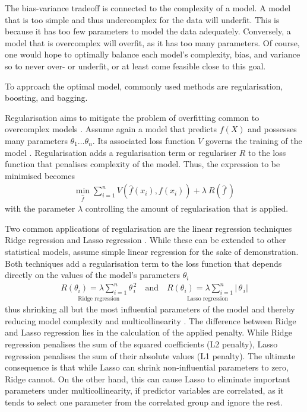 The bias-variance tradeoff is connected to the complexity of a model. A model 
that is too simple and thus undercomplex for the data will underfit. This is 
because it has too few parameters to model the data adequately. Conversely, a 
model that is overcomplex will overfit, as it has too many parameters. Of
course, one would hope to optimally balance each model's complexity, bias, and
variance so to never over- or underfit, or at least come feasible close to
this goal.

To approach the optimal model, commonly used methods are regularisation,
boosting, and bagging.
\bigbreak

\noindent Regularisation  aims to mitigate the 
problem of overfitting common to overcomplex models \citep{Deisenroth2020}. 
Assume again a model that predicts $f\!\left(X\right)$ and possesses many 
parameters $\theta_1\dots\theta_n$. Its associated loss function $V$ governs 
the training of the model \citep{Rosasco2003}. Regularisation adds a 
regularisation term or regulariser $R$ to the loss function that penalises 
complexity of the model. Thus, the expression to be minimised becomes
\begin{align*}
  \min_{\widehat{f}}\sum_{i=1}^n
  V\!\left(\widehat{f}\!\left(x_i\right),f\!\left(x_i\right)\right)+
  \lambda\:R\!\left(\widehat{f}\:\right)
\end{align*}
with the parameter $\lambda$ controlling the amount of regularisation that is
applied.

Two common applications of regularisation are the linear regression techniques 
Ridge regression \citep{Hoerl1970} and Lasso regression \citep{Tibshirani1996}.
While these can be extended to other statistical models, assume simple linear
regression for the sake of demonstration. Both techniques add a regularisation
term to the loss function that depends directly on the values of the model's
parameters $\theta_i$
\begin{align*}
  \underset{\text{Ridge regression}}{
    R\left(\theta_{i}\right)=\lambda\sum_{i=1}^{n}\theta_{\,i}^{\,2}
  }
  \quad\text{and}\quad
  \underset{\text{Lasso regression}}{
    R\left(\theta_{i}\right)=\lambda\sum_{i=1}^{n}\left|\,\theta_{\,i}\right|
  }
\end{align*}
thus shrinking all but the most influential parameters of the model and 
thereby reducing model complexity and multicollinearity \citep{Herawati2018}. 
The difference between Ridge and Lasso regression lies in the calculation of 
the applied penalty. While Ridge regression penalises the sum of the squared 
coefficients (L2 penalty), Lasso regression penalises the sum of their 
absolute values (L1 penalty). The ultimate consequence is that while Lasso can 
shrink non-influential parameters to zero, Ridge cannot. On the other hand, 
this can cause Lasso to eliminate important parameters under 
multicollinearity, if predictor variables are correlated, as it tends to 
select one parameter from the correlated group and ignore the rest.

